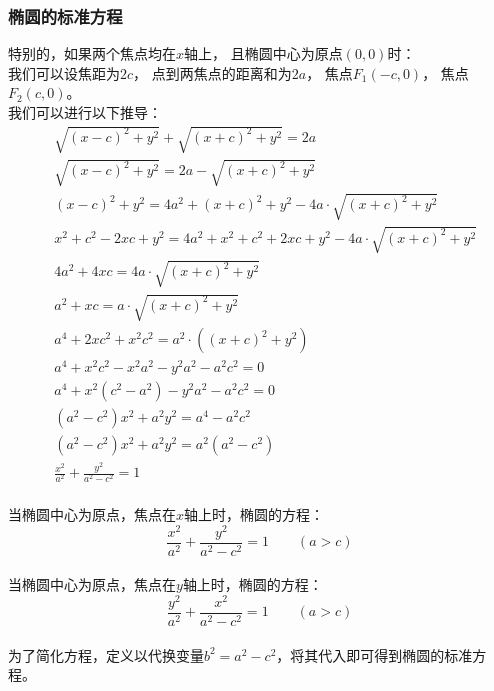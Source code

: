 \documentclass[UTF8]{ctexart}
\begin{document}
\subsubsection{椭圆的标准方程}
    特别的，如果两个焦点均在$x$轴上，
    且椭圆中心为原点$(0,0)$时：\\
    我们可以设焦距为$2c$，
    点到两焦点的距离和为$2a$，
    焦点$F_1(-c,0)$，
    焦点$F_2(c,0)$。\\[3mm]
    我们可以进行以下推导：\vspace{3pt}
    \setcounter{equation}{0}
    \begin{align}
        &\sqrt{(x-c)^2+y^2}+\sqrt{(x+c)^2+y^2}=2a\\[3.5mm]
        &\sqrt{(x-c)^2+y^2}=2a-\sqrt{(x+c)^2+y^2}\\[3.5mm]
        &(x-c)^2+y^2=4a^2+(x+c)^2+y^2-4a \cdot \sqrt{(x+c)^2+y^2}\\[3.5mm]
        &x^2+c^2-2xc+y^2=4a^2+x^2+c^2+2xc+y^2-4a \cdot \sqrt{(x+c)^2+y^2}\\[3.5mm]
        &4a^2+4xc=4a \cdot \sqrt{(x+c)^2+y^2}\\[3.5mm]
        &a^2+xc=a \cdot \sqrt{(x+c)^2+y^2}\\[3.5mm]
        &a^4+2xc^2+x^2c^2=a^2 \cdot ((x+c)^2+y^2)\\[3.5mm]
        &a^4+x^2c^2-x^2a^2-y^2a^2-a^2c^2=0\\[3.5mm]
        &a^4+x^2(c^2-a^2)-y^2a^2-a^2c^2=0\\[3.5mm]
        &(a^2-c^2)x^2+a^2y^2=a^4-a^2c^2\\[3.5mm]
        &(a^2-c^2)x^2+a^2y^2=a^2(a^2-c^2)\\[3.5mm]
        &\frac{x^2}{a^2}+\frac{y^2}{a^2-c^2}=1
    \end{align}\\
    当椭圆中心为原点，焦点在$x$轴上时，椭圆的方程：\vspace{5pt}
    \begin{equation}
        \frac{x^2}{a^2}+\frac{y^2}{a^2-c^2}=1\qquad(a>c)
    \end{equation}\\
    当椭圆中心为原点，焦点在$y$轴上时，椭圆的方程：\vspace{5pt}
    \begin{equation}
        \frac{y^2}{a^2}+\frac{x^2}{a^2-c^2}=1\qquad(a>c)
    \end{equation}\\
    为了简化方程，定义以代换变量$b^2=a^2-c^2$，将其代入即可得到椭圆的标准方程。
\end{document}
